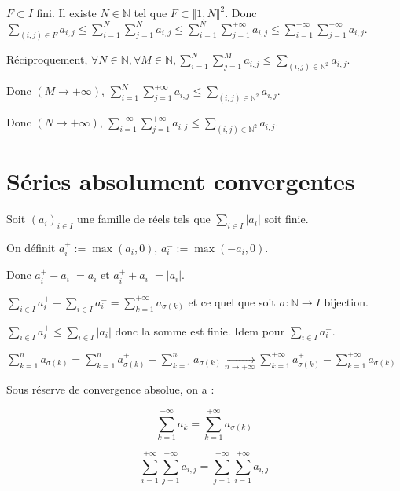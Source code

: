 \documentclass[10pt,a4paper,notitlepage ]{report}
\begin{document}
\begin{demo}
	$F\subset I$ fini. Il existe $N \in \mathbb N$ tel que $F \subset \llbracket 1,N\rrbracket^2$. Donc $\sum_{(i,j)\in F}a_{i,j} \le \sum_{i=1}^{N}\sum_{j=1}^{N}a_{i,j} \le
	\sum_{i=1}^N\sum_{j=1}^{+\infty}a_{i,j} \le
	\sum_{i=1}^{+\infty}\sum_{j=1}^{+\infty}a_{i,j}$.
	
	Réciproquement, $\forall N\in\mathbb N, \forall M \in\mathbb N, \sum_{i=1}^N\sum_{j=1}^Ma_{i,j} \le
	\sum_{(i,j)\in \mathbb N^2}a_{i,j}$.
	
	Donc $(M\rightarrow +\infty)$, $\sum_{i=1}^N\sum_{j=1}^{+\infty}a_{i,j} \le
	\sum_{(i,j)\in \mathbb N^2}a_{i,j}$.
	
	Donc $(N\rightarrow +\infty)$, $\sum_{i=1}^{+\infty}\sum_{j=1}^{+\infty}a_{i,j} \le
	\sum_{(i,j)\in \mathbb N^2}a_{i,j}$.
\end{demo}

\section{Séries absolument convergentes}

Soit $(a_i)_{i\in I}$ une famille de réels tels que $\sum_{i\in I}|a_i|$ soit finie.

On définit $a_i^+ := \max(a_i,0)$, $a_i^- := \max(-a_i, 0)$.

Donc $a_i^+ - a_i^- = a_i$ et $a_i^+ + a_i^- = |a_i|$.

\begin{propriete}
	$\sum_{i\in I}a_i^+ - \sum_{i\in I}a_i^- = \sum_{k=1}^{+\infty}a_{\sigma(k)}$ et ce quel que soit $\sigma : \mathbb N \rightarrow I$ bijection.
\end{propriete}

\begin{demo}
	$\sum_{i\in I}a_i^+ \le \sum_{i\in I} |a_i|$ donc la somme est finie. Idem pour $\sum_{i\in I}a_i^-$.
	
	$\sum_{k=1}^n a_{\sigma(k)} = \sum_{k=1}^n a_{\sigma(k)}^+ - \sum_{k=1}^n a_{\sigma(k)}^- \underset{n\rightarrow +\infty}{\rightarrow}
	\sum_{k=1}^{+\infty}a_{\sigma(k)}^+ - \sum_{k=1}^{+\infty}a_{\sigma(k)}^-$
\end{demo}
\begin{corollaire}
	Sous réserve de convergence absolue, on a :
	
	\[\sum_{k=1}^{+\infty}a_k = \sum_{k=1}^{+\infty} a_{\sigma(k)}\]
	
	\[\sum_{i=1}^{+\infty}\sum_{j=1}^{+\infty}a_{i,j} =
	\sum_{j=1}^{+\infty}\sum_{i=1}^{+\infty}a_{i,j}\]
\end{corollaire}
\end{document}
